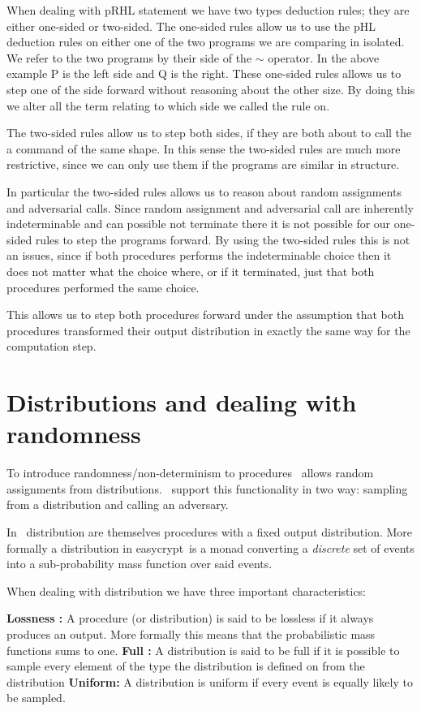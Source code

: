 When dealing with pRHL statement we have two types deduction rules; they are
either one-sided or two-sided.
The one-sided rules allow us to use the pHL deduction rules on either one of the
two programs we are comparing in isolated. We refer to the two programs by their
side of the $\sim$ operator. In the above example P is the left side and Q is
the right.
These one-sided rules allows us to step one of the side forward without
reasoning about the other size. By doing this we alter all the term relating to
which side we called the rule on.

The two-sided rules allow us to step both sides, if they are both about to call
the a command of the same shape. In this sense the two-sided rules are much more
restrictive, since we can only use them if the programs are similar in structure.

In particular the two-sided rules allows us to reason about random assignments
and adversarial calls.
Since random assignment and adversarial call are inherently indeterminable and can
possible not terminate there it is not possible for our one-sided rules to
step the programs forward. By using the two-sided rules this is not an issues,
since if both procedures performs the indeterminable choice then it does not
matter what the choice where, or if it terminated, just that both procedures
performed the same choice.

This allows us to step both procedures forward under the assumption that both
procedures transformed their output distribution in exactly the same way for the
computation step.

\section{Distributions and dealing with randomness}
\label{sec:easycrypt:distributions}
To introduce randomness/non-determinism to procedures \easycrypt\ allows
random assignments from distributions. \easycrypt\ support this functionality in
two way: sampling from a distribution and calling an adversary.

In \easycrypt\ distribution are themselves procedures with a fixed output
distribution. More formally a distribution in easycrypt\ is a monad converting a
\textit{discrete} set of events into a sub-probability mass function over said events.

When dealing with distribution we have three important characteristics:

\noindent \textbf{Lossness :} A procedure (or distribution) is said to be
lossless if it always produces an output. More formally this means that the
probabilistic mass functions sums to one.
\noindent \textbf{Full :} A distribution is said to be full if it is
possible to sample every element of the type the distribution is defined on from
the distribution
\noindent \textbf{Uniform: } A distribution is uniform if every event is equally
likely to be sampled.

